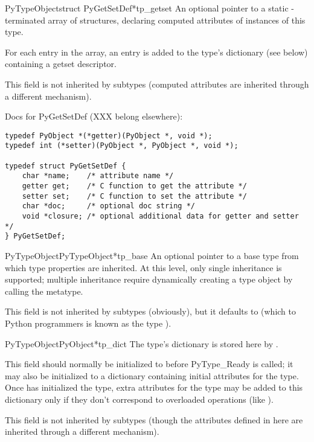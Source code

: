 \begin{cmemberdesc}{PyTypeObject}{struct PyGetSetDef*}{tp_getset}
  An optional pointer to a static \NULL-terminated array of
   structures, declaring computed attributes of
  instances of this type.

  For each entry in the array, an entry is added to the type's
  dictionary (see  below) containing a getset
  descriptor.

  This field is not inherited by subtypes (computed attributes are
  inherited through a different mechanism).

  Docs for PyGetSetDef (XXX belong elsewhere):

\begin{verbatim}
typedef PyObject *(*getter)(PyObject *, void *);
typedef int (*setter)(PyObject *, PyObject *, void *);

typedef struct PyGetSetDef {
    char *name;    /* attribute name */
    getter get;    /* C function to get the attribute */
    setter set;    /* C function to set the attribute */
    char *doc;     /* optional doc string */
    void *closure; /* optional additional data for getter and setter */
} PyGetSetDef;
\end{verbatim}
\end{cmemberdesc}

\begin{cmemberdesc}{PyTypeObject}{PyTypeObject*}{tp_base}
  An optional pointer to a base type from which type properties are
  inherited.  At this level, only single inheritance is supported;
  multiple inheritance require dynamically creating a type object by
  calling the metatype.

  This field is not inherited by subtypes (obviously), but it defaults
  to  (which to Python programmers is known
  as the type ).
\end{cmemberdesc}

\begin{cmemberdesc}{PyTypeObject}{PyObject*}{tp_dict}
  The type's dictionary is stored here by .

  This field should normally be initialized to \NULL{} before
  PyType_Ready is called; it may also be initialized to a dictionary
  containing initial attributes for the type.  Once
   has initialized the type, extra
  attributes for the type may be added to this dictionary only if they
  don't correspond to overloaded operations (like ).

  This field is not inherited by subtypes (though the attributes
  defined in here are inherited through a different mechanism).
\end{cmemberdesc}

